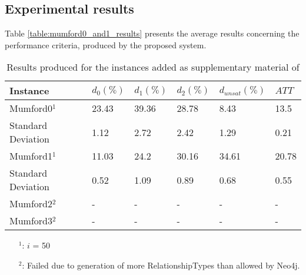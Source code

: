 \subsection{Experimental results}
\label{subsec:scalabilityExperiments_results}


Table \vref{table:mumford0_and1_results} presents the average results concerning the performance criteria, produced by the proposed system.

\begin{table}[H]
    \centering
    \hspace*{-1.0cm}
    \begin{tabular}{|l|l|l|l|l|l|}
        \hline
        \textbf{Instance} & $d_0(\%)$ & $d_1(\%)$ & $d_2(\%)$ & $d_{unsat}(\%)$ & $ATT$\\
        \hline
        Mumford0$^1$ & 23.43 & 39.36 & 28.78 & 8.43 & 13.5\\
        Standard Deviation & 1.12 & 2.72 & 2.42 & 1.29 & 0.21\\
        \hline
        Mumford1$^1$ & 11.03 & 24.2 & 30.16 & 34.61 & 20.78\\
        Standard Deviation & 0.52 & 1.09 & 0.89 & 0.68 & 0.55\\
        \hline
        Mumford2$^2$ & - & - & - & - & - \\
        Mumford3$^2$ & - & - & - & - & - \\
        \hline
    \end{tabular}
    \caption{Results produced for the instances added as supplementary material of \citet{mumford13}}
    \tiny
    \begin{itemize}[noitemsep]
    \item[$^1$:] $i$ = 50
    \item[$^2$:] Failed due to generation of more RelationshipTypes than allowed by Neo4j.
    \end{itemize}
    \label{table:mumford0_and1_results}
\end{table}

